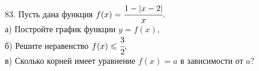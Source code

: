 83. Пусть дана функция $f(x)=\cfrac{1-|x-2|}{x}.$\\
а) Постройте график функции $y=f(x),$\\
б) Решите неравенство $f(x)\leqslant\cfrac{3}{2},$\\
в) Сколько корней имеет уравнение $f(x)=a$ в зависимости от $a?$\\
